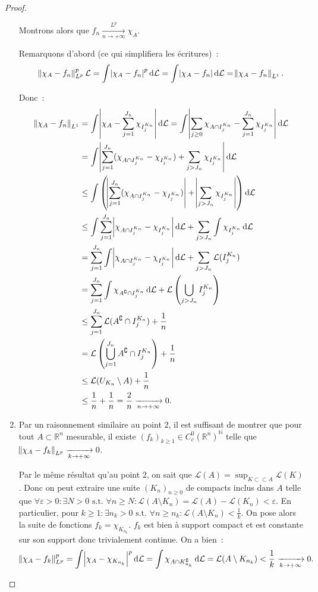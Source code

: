 \documentclass{article}
\newcommand{\pinfty}{{+\infty}}
\newcommand{\st}{\text{ s.t. }}
\newcommand{\C}{\complement}
\newcommand{\N}{{\mathbb N}}
\newcommand{\R}{{\mathbb R}}
\begin{document}
\begin{proof}
\begin{enumerate}
	Montrons alors que $f_n \xrightarrow[n \to \pinfty]{L^p} \chi_A$.

	Remarquons d'abord (ce qui simplifiera les écritures)~:
	\[\norm {\chi_A-f_n}^p_{L^p}\mathcal L = \int\abs {\chi_A-f_n}^p\dif\mathcal L = \int\abs {\chi_A - f_n}\dif\mathcal L = \norm {\chi_A-f_n}_{L^1}.\]

	Donc~:
	\begin{align*}
		\norm {\chi_A-f_n}_{L^1} &= \int\abs {\chi_A - \sum_{j=1}^{J_n}\chi_{I^{K_n}_j}}\dif\mathcal L
			= \int\abs {\sum_{j \geq 0}\chi_{A \cap I^{K_n}_j} - \sum_{j=1}^{J_n}\chi_{I^{K_n}_j}}\dif\mathcal L \\
		&= \int\abs {\sum_{j=1}^{J_n}(\chi_{A \cap I^{K_n}_j}-\chi_{I^{K_n}_j}) + \sum_{j > J_n}\chi_{I^{K_n}_j}}\dif\mathcal L \\
		&\leq \int\left(\abs {\sum_{j=1}^{J_n}(\chi_{A \cap I^{K_n}_j}-\chi_{I^{K_n}_j})} + \abs {\sum_{j > J_n}\chi_{I^{K_n}_j}}\right) \dif\mathcal L \\
		&\leq \int\sum_{j=1}^{J_n}\abs {\chi_{A \cap I^{K_n}_j}-\chi_{I^{K_n}_j}}\dif\mathcal L + \sum_{j > J_n}\int\chi_{I^{K_n}_j}\dif\mathcal L \\
		&= \sum_{j=1}^{J_n}\int\abs {\chi_{A \cap I^{K_n}_j}-\chi_{I^{K_n}_j}}\dif\mathcal L + \sum_{j > J_n}\mathcal L(I^{K_n}_j) \\
		&= \sum_{j=1}^{J_n}\int\chi_{A^\C \cap I^{K_n}_j}\dif\mathcal L + \mathcal L\left(\bigcup_{j > J_n}I^{K_n}_j\right) \\
		&\leq \sum_{j=1}^{J_n}\mathcal L(A^\C \cap I^{K_n}_j) + \frac 1n \\
		&= \mathcal L\left(\bigcup_{j=1}^{J_n}A^\C \cap I^{K_n}_j\right) + \frac 1n \\
		&\leq \mathcal L(U_{K_n} \setminus A) + \frac 1n \\
		&\leq \frac 1n + \frac 1n = \frac 2n \xrightarrow[n \to \pinfty]{} 0.
	\end{align*}

	\item Par un raisonnement similaire au point 2, il est suffisant de montrer que pour tout $A \subset \R^n$ mesurable, il existe $(f_k)_{k \geq 1} \in C^0_c(\R^n)^\N$ telle que
	$\norm {\chi_A-f_k}_{L^p} \xrightarrow[k \to \pinfty]{} 0$.

	Par le même résultat qu'au point 2, on sait que $\mathcal L(A) = \sup_{K \subset\subset A}\mathcal L(K)$. Donc on peut extraire une suite $(K_n)_{n \geq 0}$ de compacts
	inclus dans $A$ telle que $\forall \varepsilon > 0 : \exists N > 0 \st \forall n \geq N : \mathcal L(A \setminus K_n) = \mathcal L(A) - \mathcal L(K_n) < \varepsilon$.
	En particulier, pour $k \geq 1 : \exists n_k > 0 \st \forall n \geq n_k : \mathcal L(A \setminus K_n) < \frac 1k$. On pose alors la suite de fonctions $f_k = \chi_{K_{n_k}}$.
	$f_k$ est bien à support compact et est constante sur son support donc trivialement continue. On a bien~:
	\[\norm {\chi_A - f_k}_{L^p}^p = \int\abs {\chi_A-\chi_{K_{n_k}}}^p\dif\mathcal L = \int\chi_{A \cap K_{n_k}^\C}\dif\mathcal L = \mathcal L(A \setminus K_{n_k})
		< \frac 1k \xrightarrow[k \to \pinfty]{} 0.\]


\end{enumerate}
\end{proof}
\end{document}

